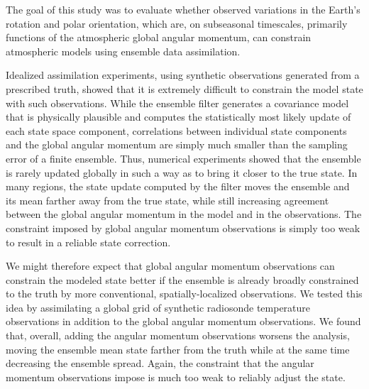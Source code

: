 
The goal of this study was to evaluate whether observed variations in the Earth's rotation and polar orientation, which are, on subseasonal timescales, primarily functions of the atmospheric global angular momentum, can constrain atmospheric models using ensemble data assimilation. 

Idealized assimilation experiments, using synthetic observations generated from a prescribed truth, showed that it is extremely difficult to constrain the model state with such observations.  
While the ensemble filter generates a covariance model that is physically plausible and computes the statistically most likely update of each state space component, correlations between individual state components and the global angular momentum are simply much smaller than the sampling error of a finite ensemble. 
Thus, numerical experiments showed that the ensemble is rarely updated globally in such a way as to bring it closer to the true state. 
In many regions, the state update computed by the filter moves the ensemble and its mean farther away from the true state, while still increasing agreement between the global angular momentum in the model and in the observations. 
The constraint imposed by global angular momentum observations is simply too weak to result in a reliable state correction. 

We might therefore expect that global angular momentum observations can constrain the modeled state better if the ensemble is already broadly constrained to the truth by more conventional, spatially-localized observations. 
We tested this idea by assimilating a global grid of synthetic radiosonde temperature observations in addition to the global angular momentum observations. 
We found that, overall, adding the angular momentum observations worsens the analysis, moving the ensemble mean state farther from the truth while at the same time decreasing the ensemble spread.
Again, the constraint that the angular momentum observations impose is much too weak to reliably adjust the state.

